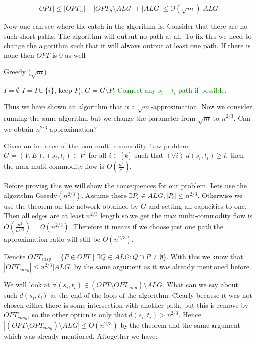 $$
|OPT| \leq |OPT_{L}| + |OPT_{S} \setminus ALG| + |ALG| \leq O(\sqrt{m}) |ALG|
$$

Now one can see where the catch in the algorithm is. Consider that there are no such short paths. The algorithm will output no path at all. To fix this we need to change the algorithm such that it will always output at least one path. If there is none then $OPT$ is 0 as well.

\begin{algorithm}
	\caption{Greedy ($\sqrt{m}$)}
	\begin{algorithmic}[1]
		\State $I = \emptyset$
		\State $I = I \cup \{i\}$, keep $P_{i}$, $G = G \setminus P_{i}$
		\EndWhile
		\If{\textcolor{Green}{$I = \emptyset$}}
			\State \textcolor{Green}{Connect any $s_{i}-t_{i}$ path if possible.}
		\EndIf
	\end{algorithmic}
\end{algorithm}

Thus we have shown an algorithm that is a $\sqrt{m}$-approximation. Now we consider running the same algorithm but we change the parameter from $\sqrt{m}$ to $n^{2/3}$. Can we obtain $n^{2/3}$-approximation?

\begin{thm}
	\label{max flow bounded}
	Given an instance of the sum multi-commodity flow problem $G =(V,E), (s_{i}, t_{i}) \in V^2$ for all $i \in [k]$ such that $(\forall i) \ d(s_{i}, t_{i}) \geq l$, then the max multi-commodity flow is $O(\frac{n^2}{l^2})$.
\end{thm}

Before proving this we will show the consequences for our problem. Lets use the algorithm Greedy$(n^{2/3})$. Assume there $\exists P_{i} \in ALG, |P_{i}| \leq n^{2/3}$. Otherwise we use the theorem on the network obtained by $G$ and setting all capacities to one. Then all edges are at least $n^{2/3}$ length so we get the max multi-commodity flow is $O(\frac{n^{2}}{n^{4/3}}) = O(n^{2/3})$. Therefore it means if we choose just one path the approximation ratio will still be $O(n^{2/3})$.

Denote $OPT_{easy} = \{P \in OPT \mid \exists Q \in ALG : Q \cap P \neq \emptyset\}$. With this we know that $|OPT_{easy}| \leq n^{2/3} |ALG|$ by the same argument as it was already mentioned before.

We will look at $\forall (s_{i}, t_{i}) \in (OPT \setminus OPT_{easy}) \setminus ALG$. What can we say about such $d(s_{i}, t_{i})$ at the end of the loop of the algorithm. Clearly because it was not chosen either there is some intersection with another path, but this is remove by $OPT_{easy}$, so the other option is only that $d(s_{i}, t_{i}) > n^{2/3}$. Hence $|(OPT \setminus OPT_{easy}) \setminus ALG| \leq O(n^{2/3})$ by the theorem and the same argument which was already mentioned. Altogether we have:

